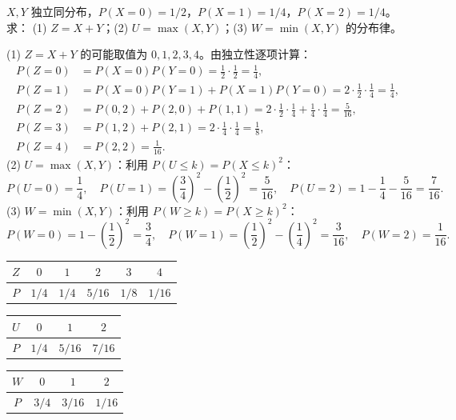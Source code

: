 \documentclass[lang=cn,11pt]{elegantbook}
\begin{document}
\begin{exercise} \label{exer:3-d3}
$X,Y$ 独立同分布，$P(X=0)=1/2$，$P(X=1)=1/4$，$P(X=2)=1/4$。求：
(1) $Z=X+Y$；(2) $U=\max(X,Y)$；(3) $W=\min(X,Y)$ 的分布律。
\end{exercise}
\begin{solution}
(1) $Z=X+Y$ 的可能取值为 $0,1,2,3,4$。由独立性逐项计算：
\begin{align*}
P(Z=0) &= P(X=0)P(Y=0) = \frac{1}{2}\cdot\frac{1}{2} = \frac{1}{4}, \\
P(Z=1) &= P(X=0)P(Y=1)+P(X=1)P(Y=0) = 2\cdot\frac{1}{2}\cdot\frac{1}{4} = \frac{1}{4}, \\
P(Z=2) &= P(0,2)+P(2,0)+P(1,1) = 2\cdot\frac{1}{2}\cdot\frac{1}{4}+\frac{1}{4}\cdot\frac{1}{4} = \frac{5}{16}, \\
P(Z=3) &= P(1,2)+P(2,1) = 2\cdot\frac{1}{4}\cdot\frac{1}{4} = \frac{1}{8}, \\
P(Z=4) &= P(2,2) = \frac{1}{16}.
\end{align*}
(2) $U=\max(X,Y)$：利用 $P(U \leqslant k) = P(X \leqslant k)^2$：
\[
P(U=0) = \frac{1}{4},\quad P(U=1) = \left(\frac{3}{4}\right)^2 - \left(\frac{1}{2}\right)^2 = \frac{5}{16},\quad P(U=2) = 1-\frac{1}{4}-\frac{5}{16} = \frac{7}{16}.
\]
(3) $W=\min(X,Y)$：利用 $P(W \geqslant k) = P(X \geqslant k)^2$：
\[
P(W=0) = 1-\left(\frac{1}{2}\right)^2 = \frac{3}{4},\quad P(W=1) = \left(\frac{1}{2}\right)^2-\left(\frac{1}{4}\right)^2 = \frac{3}{16},\quad P(W=2) = \frac{1}{16}.
\]
\begin{center}
\begin{tabular}{c|ccccc}
\toprule
$Z$ & $0$ & $1$ & $2$ & $3$ & $4$ \\
\midrule
$P$ & $1/4$ & $1/4$ & $5/16$ & $1/8$ & $1/16$ \\
\bottomrule
\end{tabular}
\quad
\begin{tabular}{c|ccc}
\toprule
$U$ & $0$ & $1$ & $2$ \\
\midrule
$P$ & $1/4$ & $5/16$ & $7/16$ \\
\bottomrule
\end{tabular}
\quad
\begin{tabular}{c|ccc}
\toprule
$W$ & $0$ & $1$ & $2$ \\
\midrule
$P$ & $3/4$ & $3/16$ & $1/16$ \\
\bottomrule
\end{tabular}
\end{center}
\end{solution}
\end{document}
